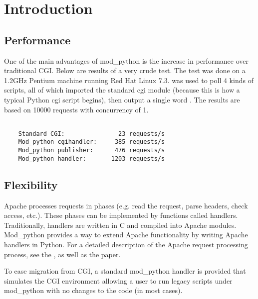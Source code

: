\chapter{Introduction\label{introduction}}

\section{Performance\label{intr-performance}}

  One of the main advantages of mod_python is the increase in
  performance over traditional CGI. Below are results of a very crude
  test. The test was done on a 1.2GHz Pentium machine running Red Hat
  Linux
  7.3. 
  was used to poll 4 kinds of scripts, all of which imported the
  standard cgi module (because this is how a typical Python cgi script
  begins), then output a single word . The results are
  based on 10000 requests with concurrency of 1.

\begin{verbatim}

    Standard CGI:               23 requests/s
    Mod_python cgihandler:     385 requests/s
    Mod_python publisher:      476 requests/s
    Mod_python handler:       1203 requests/s

\end{verbatim}         

\section{Flexibility\label{intr-flexibility}}

  Apache processes requests in phases (e.g. read the request, parse
  headers, check access, etc.). These phases can be implemented by
  functions called handlers. Traditionally, handlers are written in C
  and compiled into Apache modules. Mod_python provides a way to
  extend Apache functionality by writing Apache handlers in
  Python. For a detailed description of the Apache request processing
  process, see the , as well as the
   paper.

  To ease migration from CGI, a standard mod_python handler is
  provided that simulates the CGI environment allowing a user to run
  legacy scripts under mod_python with no changes to the code (in most
  cases).
 
